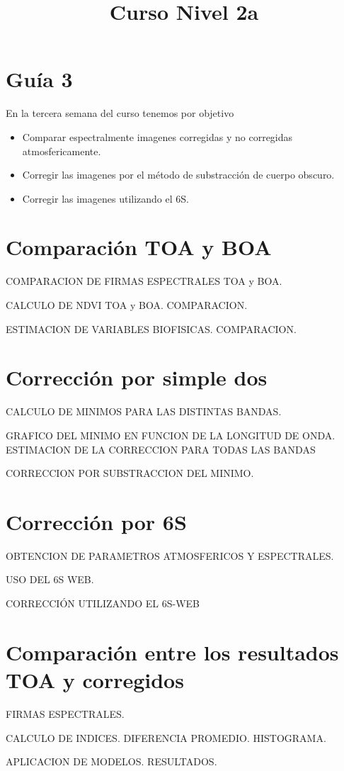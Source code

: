 \documentclass[a4paper]{article}
\title{Curso Nivel 2a}
\begin{document}
\section{Guía 3}
En la tercera semana del curso tenemos por objetivo
\begin{itemize}
    \item Comparar espectralmente imagenes corregidas y no corregidas atmosfericamente.
    \item Corregir las imagenes por el método de substracción de cuerpo obscuro.
    \item Corregir las imagenes utilizando el 6S.
\end{itemize}

\section{Comparación TOA y BOA}

COMPARACION DE FIRMAS ESPECTRALES TOA y BOA.

CALCULO DE NDVI TOA y BOA. COMPARACION.

ESTIMACION DE VARIABLES BIOFISICAS. COMPARACION.

\section{Corrección por simple dos}

CALCULO DE MINIMOS PARA LAS DISTINTAS BANDAS.

GRAFICO DEL MINIMO EN FUNCION DE LA LONGITUD DE ONDA. ESTIMACION DE LA CORRECCION PARA TODAS LAS BANDAS

CORRECCION POR SUBSTRACCION DEL MINIMO.
\section{Corrección por 6S}

OBTENCION DE PARAMETROS ATMOSFERICOS Y ESPECTRALES.

USO DEL 6S WEB.

CORRECCIÓN UTILIZANDO EL 6S-WEB

\section{Comparación entre los resultados TOA y corregidos}

FIRMAS ESPECTRALES.

CALCULO DE INDICES. DIFERENCIA PROMEDIO. HISTOGRAMA.

APLICACION DE MODELOS. RESULTADOS.
\end{document}
